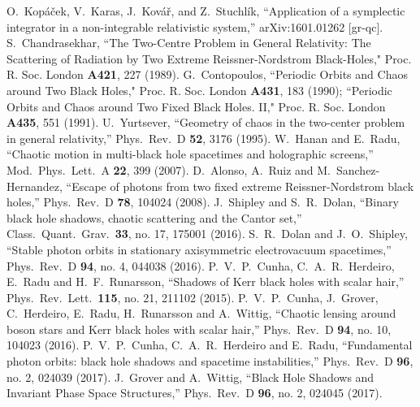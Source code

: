 \documentclass[twocolumn,showpacs,preprintnumbers,amsmath,amssymb,floatfix,nofootinbib]{revtex4-1}
\begin{document}
\begin{thebibliography}{99}
 O.~Kop\'a\v cek, V.~Karas, J.~Kov\'a\v r, and Z.~Stuchl\'ik, ``Application of a symplectic integrator in a non-integrable relativistic system,'' arXiv:1601.01262 [gr-qc].
 S.~Chandrasekhar, ``The Two-Centre Problem in General Relativity: The Scattering of Radiation by Two Extreme Reissner-Nordstrom Black-Holes," Proc. R. Soc. London {\bf A421}, 227 (1989). 
 G.~Contopoulos, ``Periodic Orbits and Chaos around Two Black Holes," Proc. R. Soc. London {\bf A431}, 183 (1990); ``Periodic Orbits and Chaos around Two Fixed Black Holes. II," Proc. R. Soc. London {\bf A435}, 551 (1991).
 U.~Yurtsever, ``Geometry of chaos in the two-center problem in general relativity,'' Phys.\ Rev.\ D {\bf 52}, 3176 (1995).
 W.~Hanan and E.~Radu, ``Chaotic motion in multi-black hole spacetimes and holographic screens,'' Mod.\ Phys.\ Lett.\ A {\bf 22}, 399 (2007).
 D.~Alonso, A.~Ruiz and M.~Sanchez-Hernandez, ``Escape of photons from two fixed extreme Reissner-Nordstrom black holes,'' Phys.\ Rev.\ D {\bf 78}, 104024 (2008).
 J.~Shipley and S.~R.~Dolan, ``Binary black hole shadows, chaotic scattering and the Cantor set,'' Class.\ Quant.\ Grav.\  {\bf 33}, no. 17, 175001 (2016).  
 S.~R.~Dolan and J.~O.~Shipley, ``Stable photon orbits in stationary axisymmetric electrovacuum spacetimes,'' Phys.\ Rev.\ D {\bf 94}, no. 4, 044038 (2016).
 P.~V.~P.~Cunha, C.~A.~R.~Herdeiro, E.~Radu and H.~F.~Runarsson, ``Shadows of Kerr black holes with scalar hair,'' Phys.\ Rev.\ Lett.\  {\bf 115}, no. 21, 211102 (2015).
 P.~V.~P.~Cunha, J.~Grover, C.~Herdeiro, E.~Radu, H.~Runarsson and A.~Wittig, ``Chaotic lensing around boson stars and Kerr black holes with scalar hair,'' Phys.\ Rev.\ D {\bf 94}, no. 10, 104023 (2016).
 P.~V.~P.~Cunha, C.~A.~R.~Herdeiro and E.~Radu, ``Fundamental photon orbits: black hole shadows and spacetime instabilities,'' Phys.\ Rev.\ D {\bf 96}, no. 2, 024039 (2017).
 J.~Grover and A.~Wittig, ``Black Hole Shadows and Invariant Phase Space Structures,'' Phys.\ Rev.\ D {\bf 96}, no. 2, 024045 (2017).

\end{thebibliography}
\end{document}
